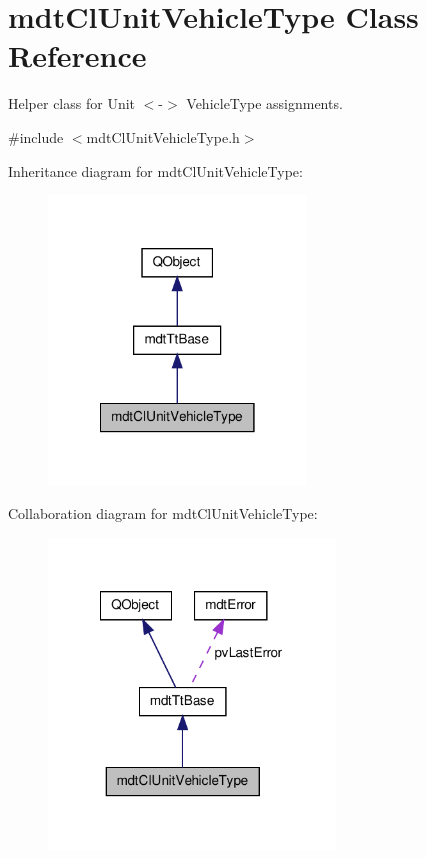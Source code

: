 \hypertarget{classmdt_cl_unit_vehicle_type}{\section{mdt\-Cl\-Unit\-Vehicle\-Type Class Reference}
\label{classmdt_cl_unit_vehicle_type}
}


Helper class for Unit $<$-\/$>$ Vehicle\-Type assignments.  




{\ttfamily \#include $<$mdt\-Cl\-Unit\-Vehicle\-Type.\-h$>$}



Inheritance diagram for mdt\-Cl\-Unit\-Vehicle\-Type\-:\nopagebreak
\begin{figure}[H]
\begin{center}
\leavevmode
\includegraphics[width=194pt]{classmdt_cl_unit_vehicle_type__inherit__graph}
\end{center}
\end{figure}


Collaboration diagram for mdt\-Cl\-Unit\-Vehicle\-Type\-:\nopagebreak
\begin{figure}[H]
\begin{center}
\leavevmode
\includegraphics[width=216pt]{classmdt_cl_unit_vehicle_type__coll__graph}
\end{center}
\end{figure}
